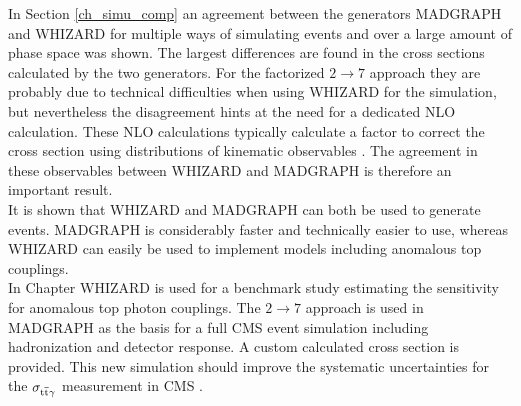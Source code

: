 In Section \ref{ch_simu_comp} an agreement between the generators MADGRAPH and WHIZARD for multiple ways of simulating \ttgamma events and over a large amount of phase space was shown. The largest differences are found in the cross sections calculated by the two generators. For the factorized $2 \to 7$ approach they are probably due to technical difficulties when using WHIZARD for the simulation, but nevertheless the disagreement hints at the need for a dedicated NLO calculation. These NLO calculations typically calculate a factor to correct the cross section using distributions of kinematic observables . The agreement in these observables between WHIZARD and MADGRAPH is therefore an important result.\\  
It is shown that WHIZARD and MADGRAPH can both be used to generate \ttgamma events. MADGRAPH is considerably faster and technically easier to use, whereas WHIZARD can easily be used to implement models including anomalous top couplings. \\
In Chapter  WHIZARD is used for a benchmark study estimating the sensitivity for anomalous top photon couplings. The $2 \to 7$ approach is used in MADGRAPH as the basis for a full CMS event simulation  including hadronization and detector response. A custom calculated cross section is provided.  This new simulation should improve the systematic uncertainties for the $\sigma_{\mathrm{t}\overline{\mathrm{t}} \gamma}$ measurement in CMS . 